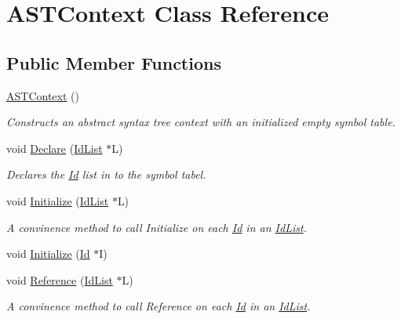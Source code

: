 \hypertarget{class_a_s_t_context}{}\section{A\+S\+T\+Context Class Reference}
\label{class_a_s_t_context}
\subsection*{Public Member Functions}
\begin{DoxyCompactItemize}
\item 
\mbox{\label{class_a_s_t_context_a1463923780957a5a38c0aaf4dbb11f52}} 
\mbox{\hyperlink{class_a_s_t_context_a1463923780957a5a38c0aaf4dbb11f52}{A\+S\+T\+Context}} ()
\begin{DoxyCompactList}\small\item\em Constructs an abstract syntax tree context with an initialized empty symbol table. \end{DoxyCompactList}\item 
void \mbox{\hyperlink{class_a_s_t_context_acd7acf552b230154c1054b02c4999bdc}{Declare}} (\mbox{\hyperlink{class_id_list}{Id\+List}} $\ast$L)
\begin{DoxyCompactList}\small\item\em Declares the \mbox{\hyperlink{class_id}{Id}} list in to the symbol tabel. \end{DoxyCompactList}\item 
void \mbox{\hyperlink{class_a_s_t_context_a0740b00839dd944ec76824fe9e8a04ec}{Initialize}} (\mbox{\hyperlink{class_id_list}{Id\+List}} $\ast$L)
\begin{DoxyCompactList}\small\item\em A convinence method to call {\ttfamily Initialize} on each {\ttfamily \mbox{\hyperlink{class_id}{Id}}} in an {\ttfamily \mbox{\hyperlink{class_id_list}{Id\+List}}}. \end{DoxyCompactList}\item 
void \mbox{\hyperlink{class_a_s_t_context_a4efe717235bbacb2951952e4066765fc}{Initialize}} (\mbox{\hyperlink{class_id}{Id}} $\ast$I)
\item 
void \mbox{\hyperlink{class_a_s_t_context_a18c75427149b0ab3bbf68c1bff35d21c}{Reference}} (\mbox{\hyperlink{class_id_list}{Id\+List}} $\ast$L)
\begin{DoxyCompactList}\small\item\em A convinence method to call {\ttfamily Reference} on each {\ttfamily \mbox{\hyperlink{class_id}{Id}}} in an {\ttfamily \mbox{\hyperlink{class_id_list}{Id\+List}}}. \end{DoxyCompactList}\item 

\end{DoxyCompactItemize}
